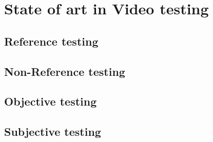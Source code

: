 
\section{State of art in Video testing}
\subsection{Reference testing}
\subsection{Non-Reference testing}
\subsection{Objective testing}
\subsection{Subjective testing}
